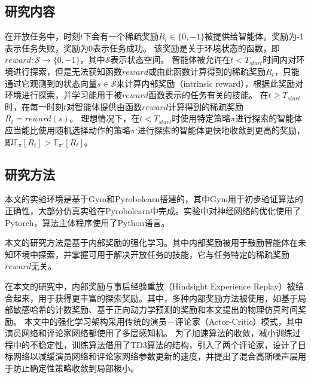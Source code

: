         \subsection{研究内容}
        在开放任务中，时刻$t$下会有一个稀疏奖励$R_t\in\{0,-1\}$被提供给智能体。奖励为-1表示任务失败，奖励为0表示任务成功。
        该奖励是关于环境状态的函数，即$reward:\mathcal S\to\{0,-1\}$，其中$\mathcal S$表示状态空间。
        智能体被允许在$t< T_{start}$时间内对环境进行探索，但是无法获知函数$reward$或由此函数计算得到的稀疏奖励$R_t$，只能通过它观测到的状态向量$s\in\mathcal S$来计算内部奖励（intrinsic reward），根据此奖励对环境进行探索，并学习能用于被$reward$函数表示的任务有关的技能。
        在$t\geq T_{start}$时，在每一时刻$t$对智能体提供由函数$reward$计算得到的稀疏奖励$R_t=reward(s)$。
        理想情况下，在$t<T_{start}$时使用特定策略$\pi$进行探索的智能体应当能比使用随机选择动作的策略$\pi‘$进行探索的智能体更快地收敛到更高的奖励，即$\mathbb E_\pi[R_t]>\mathbb E_{\pi'}[R_t]$。

        \subsection{研究方法}
        本文的实验环境是基于Gym\cite{brockman2016openai}和Pyrobolearn\cite{delhaisse2019pyrobolearn}搭建的，其中Gym用于初步验证算法的正确性，大部分仿真实验在Pyrobolearn中完成。实验中对神经网络的优化使用了Pytorch\cite{paszke2019pytorch}，算法主体程序使用了Python语言。

        本文的研究方法是基于内部奖励的强化学习。其中内部奖励被用于鼓励智能体在未知环境中探索，并掌握可用于解决开放任务的技能，它与任务特定的稀疏奖励$reward$无关。

        在本文的研究中，内部奖励与事后经验重放（Hindsight Experience Replay）被结合起来，用于获得更丰富的探索奖励。其中，多种内部奖励方法被使用，如基于局部敏感哈希的计数奖励、基于正向动力学预测的奖励和本文提出的物理仿真时间奖励。
        本文中的强化学习架构采用传统的演员－评论家（Actor-Critic）模式\cite{konda2002actor}，其中演员网络和评论家网络都使用了多层感知机。
        为了加速算法的收敛，减小训练过程中的不稳定性，训练算法借用了TD3算法\cite{DBLP:journals/corr/abs-1802-09477}的结构，引入了两个评论家，设计了目标网络以减缓演员网络和评论家网络参数更新的速度，并提出了混合高斯噪声层用于防止确定性策略收敛到局部极小。

